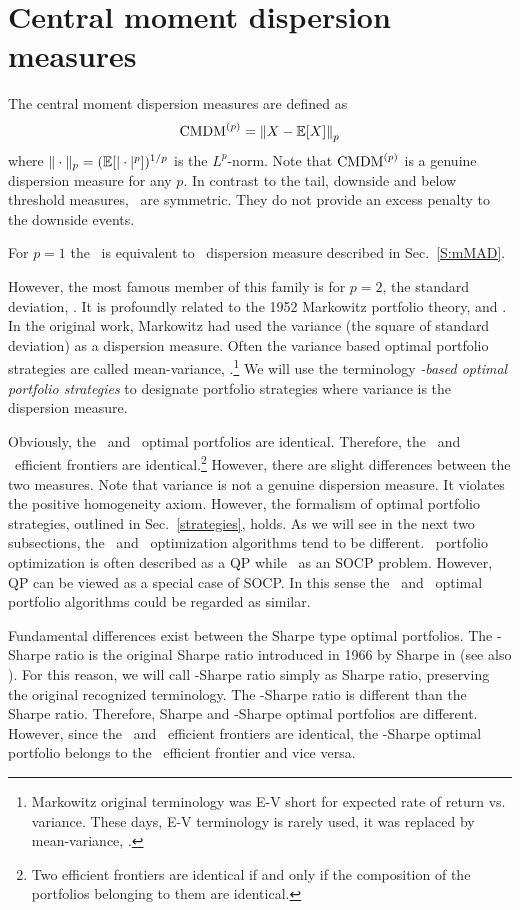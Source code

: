 
\section{Central moment dispersion measures}\label{CentralM}
The central moment dispersion measures are defined as
\begin{equation}
    \CMDM^{(p)} = \left\| X - \mE[X] \right\|_p
    \label{cmdm1}
\end{equation}
where $\|\cdot\|_p = ({\mathbb E}[|\cdot|^p])^{1/p}$ is the $L^p$-norm.
Note that ${\rm CMDM}^{(p)}$ is a genuine dispersion measure for any $p$.
In contrast to the tail, downside and below threshold measures, \CMDM\ are
symmetric. They do not provide an excess penalty to the downside
events.

For $p=1$ the \CMDM\ is equivalent to \MAD\ dispersion measure described in Sec.~\ref{S:mMAD}.

However, the most famous member of this family is for $p=2$, the standard deviation, \SD.
It is profoundly related to the 1952 Markowitz portfolio theory, \cite{Markowitz} and \cite{Markowitz2}.
In the original work, Markowitz had used the variance (the square of standard deviation) as a dispersion measure. Often the
variance based optimal portfolio strategies are called mean-variance, \MV.\footnote{Markowitz original terminology was E-V short
for expected rate of return vs. variance. These days, E-V terminology is rarely used, it was replaced by mean-variance, \MV.}
We will use the terminology {\it \MV-based optimal portfolio strategies} to designate portfolio strategies where variance is the dispersion measure.

Obviously, the \SD\ and \MV\ optimal portfolios are identical. Therefore, the \SD\ and \MV\
efficient frontiers are identical.\footnote{Two efficient frontiers are identical if and only if the composition of the portfolios
belonging to them are identical.} However, there are slight differences between the two measures.
Note that variance is not a genuine dispersion measure. It violates the positive homogeneity axiom. However, the formalism
of optimal portfolio strategies, outlined in Sec.~\ref{strategies}, holds. As we will see in the next two subsections,
the \SD\ and \MV\ optimization algorithms tend to be different.
\MV\ portfolio optimization is often described as a QP while \SD\ as an SOCP problem. However,
QP can be viewed as a special case of SOCP. In this sense the \SD\ and \MV\ optimal portfolio algorithms
could be regarded as similar.

Fundamental differences exist between the Sharpe type optimal portfolios.
The \SD-Sharpe ratio is the original Sharpe ratio introduced in 1966 by Sharpe in \cite{Sharpe1966} (see also \cite{Sharpe1994}).
For this reason, we will call \SD-Sharpe ratio simply as Sharpe ratio, preserving the original recognized terminology.
The \MV-Sharpe ratio is different than the Sharpe ratio. Therefore, Sharpe and \MV-Sharpe optimal portfolios are different.
However, since the \SD\ and \MV\ efficient frontiers are identical,
the \MV-Sharpe optimal portfolio belongs to the \SD\ efficient frontier and vice versa.

